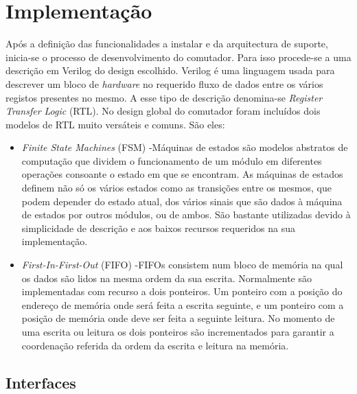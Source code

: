 \chapter{Implementação}

Após a definição das funcionalidades a instalar e da arquitectura de suporte, inicia-se o processo de desenvolvimento do comutador. Para isso procede-se a uma descrição em Verilog do design escolhido. Verilog é uma linguagem usada para descrever um bloco de \textit{hardware} no requerido fluxo de dados entre os vários registos presentes no mesmo. A esse tipo de descrição denomina-se \textit{Register Transfer Logic} (RTL). No design global do comutador foram incluídos dois modelos de RTL muito versáteis e comuns. São eles:

\begin{itemize}
  \item \textit{Finite State Machines} (FSM) -\quad Máquinas de estados são modelos abstratos de computação que dividem o funcionamento de um módulo em diferentes operações consoante o estado em que se encontram. As máquinas de estados definem não só os vários estados como as transições entre os mesmos, que podem depender do estado atual, dos vários sinais que são dados à máquina de estados por outros módulos, ou de ambos. São bastante utilizadas devido à simplicidade de descrição e aos baixos recursos requeridos na sua implementação.
   \item \textit{First-In-First-Out} (FIFO) -\quad FIFOs consistem num bloco de memória na qual os dados são lidos na mesma ordem da sua escrita. Normalmente são implementadas com recurso a dois ponteiros. Um ponteiro com a posição do endereço de memória onde será feita a escrita seguinte, e um ponteiro com a posição de memória onde deve ser feita a seguinte leitura. No momento de uma escrita ou leitura os dois ponteiros são incrementados para garantir a coordenação referida da ordem da escrita e leitura na memória. 

\end{itemize}

\section{Interfaces}


